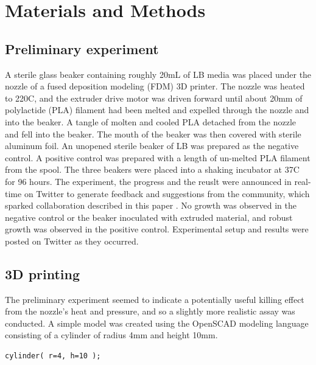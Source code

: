 \documentclass[fleqn,10pt]{wlpeerj}
\begin{document}
\section{Materials and Methods}

\subsection{Preliminary experiment}

A sterile glass beaker containing roughly 20mL of LB media was placed under the nozzle of a fused deposition modeling (FDM) 3D printer. The nozzle was heated to 220C, and the extruder drive motor was driven forward until about 20mm of polylactide (PLA) filament had been melted and expelled through the nozzle and into the beaker. A tangle of molten and cooled PLA detached from the nozzle and fell into the beaker. The mouth of the beaker was then covered with sterile aluminum foil. An unopened sterile beaker of LB was prepared as the negative control. A positive control was prepared with a length of un-melted PLA filament from the spool. The three beakers were placed into a shaking incubator at 37C for 96 hours. The experiment, the progress and the reuslt were announced in real-time on Twitter to generate feedback and suggestions from the community, which sparked collaboration described in this paper \cite{tweet_conjecture, tweet_first_result_1, tweet_first_result_2, tweet_2nd_test, tweet_2nd_result}. No growth was observed in the negative control or the beaker inoculated with extruded material, and robust growth was observed in the positive control. Experimental setup and results were posted on Twitter as they occurred. 

\subsection{3D printing}\label{3Dprinting}

The preliminary experiment seemed to indicate a potentially useful killing effect from the nozzle’s heat and pressure, and so a slightly more realistic assay was conducted. A simple model was created using the OpenSCAD \cite{OpenSCAD} modeling language consisting of a cylinder of radius 4mm and height 10mm.

\begin{verbatim}
cylinder( r=4, h=10 );
\end{verbatim}
\end{document}
